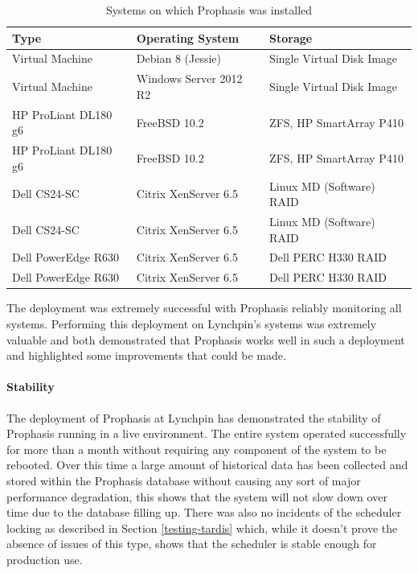 \documentclass[bsc,deptreport,twoside,parskip,singlespacing,notimes]{infthesis}
\begin{document}
\begin{table}[H]
	\centering
	\caption{Systems on which Prophasis was installed}
	\label{table-lypn-hosts}
    \begin{tabular}{|l|l|l|}
    \hline
    \textbf{Type} & \textbf{Operating System} & \textbf{Storage} \\ \hline
    Virtual Machine & Debian 8 (Jessie) & Single Virtual Disk Image \\
    Virtual Machine & Windows Server 2012 R2 & Single Virtual Disk Image \\
    HP ProLiant DL180 g6 & FreeBSD 10.2 & ZFS, HP SmartArray P410 \\
    HP ProLiant DL180 g6 & FreeBSD 10.2 & ZFS, HP SmartArray P410 \\
    Dell CS24-SC & Citrix XenServer 6.5 & Linux MD (Software) RAID \\
    Dell CS24-SC & Citrix XenServer 6.5 & Linux MD (Software) RAID \\
    Dell PowerEdge R630 & Citrix XenServer 6.5 & Dell PERC H330 RAID \\
    Dell PowerEdge R630 & Citrix XenServer 6.5 & Dell PERC H330 RAID \\ \hline
    \end{tabular}
\end{table}


	The deployment was extremely successful with Prophasis reliably monitoring all
	systems.  Performing this deployment on Lynchpin's systems was extremely
	valuable and both demonstrated that Prophasis works well in such a deployment
	and highlighted some improvements that could be made.

\paragraph*{Stability}
	The deployment of Prophasis at Lynchpin has demonstrated the stability of
	Prophasis running in a live environment.  The entire system operated
	successfully for more than a month without requiring any component of the
	system to be rebooted.  Over this time a large amount of historical data has
	been collected and stored within the Prophasis database without causing any
	sort of major performance degradation, this shows that the system will not slow
	down over time due to the database filling up.  There was also no incidents of
	the scheduler locking as described in Section \ref{testing-tardis} which,
	while it doesn't prove the absence of issues of this type, shows that the
	scheduler is stable enough for production use.
\end{document}
